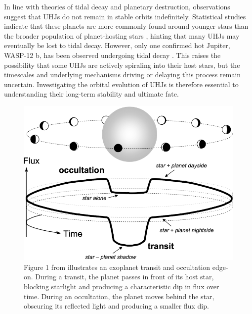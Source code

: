 \documentclass[oneside,12pt]{amsart}
\numberwithin{page}{section}
\begin{document}

In line with theories of tidal decay and planetary destruction, observations suggest that UHJs do not remain in stable orbits indefinitely. Statistical studies indicate that these planets are more commonly found around younger stars than the broader population of planet-hosting stars \citep{hamer2019hot}, hinting that many UHJs may eventually be lost to tidal decay. However, only one confirmed hot Jupiter, WASP-12 b, has been observed undergoing tidal decay \citep{yee2019orbit}. This raises the possibility that some UHJs are actively spiraling into their host stars, but the timescales and underlying mechanisms driving or delaying this process remain uncertain. Investigating the orbital evolution of UHJs is therefore essential to understanding their long-term stability and ultimate fate.

\begin{figure}[htbp]
    \centering
    \includegraphics[width=0.6\linewidth]{figs/winn_fig1.png}
    \caption{Figure 1 from \citet{winn2010transits} illustrates an exoplanet transit and occultation edge-on. During a transit, the planet passes in front of its host star, blocking starlight and producing a characteristic dip in flux over time. During an occultation, the planet moves behind the star, obscuring its reflected light and producing a smaller flux dip.}
    \label{fig:winnfig1}
\end{figure}
\end{document}
